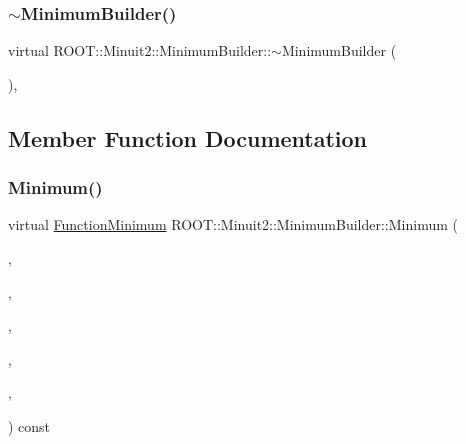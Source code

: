 \subsubsection{\texorpdfstring{$\sim$MinimumBuilder()}{~MinimumBuilder()}\hspace{0.1cm}{\footnotesize\ttfamily [3/3]}}
{\footnotesize\ttfamily virtual R\+O\+O\+T\+::\+Minuit2\+::\+Minimum\+Builder\+::$\sim$\+Minimum\+Builder (\begin{DoxyParamCaption}{ }\end{DoxyParamCaption})\hspace{0.3cm}{\ttfamily [inline]}, {\ttfamily [virtual]}}



\subsection{Member Function Documentation}
\mbox{\label{classROOT_1_1Minuit2_1_1MinimumBuilder_aefaa624436afa8195af1f3393a35981f}} 
\subsubsection{\texorpdfstring{Minimum()}{Minimum()}\hspace{0.1cm}{\footnotesize\ttfamily [1/3]}}
{\footnotesize\ttfamily virtual \mbox{\hyperlink{classROOT_1_1Minuit2_1_1FunctionMinimum}{Function\+Minimum}} R\+O\+O\+T\+::\+Minuit2\+::\+Minimum\+Builder\+::\+Minimum (\begin{DoxyParamCaption}\item[{const \mbox{\hyperlink{classROOT_1_1Minuit2_1_1MnFcn}{Mn\+Fcn}} \&}]{,  }\item[{const \mbox{\hyperlink{classROOT_1_1Minuit2_1_1GradientCalculator}{Gradient\+Calculator}} \&}]{,  }\item[{const \mbox{\hyperlink{classROOT_1_1Minuit2_1_1MinimumSeed}{Minimum\+Seed}} \&}]{,  }\item[{const \mbox{\hyperlink{classROOT_1_1Minuit2_1_1MnStrategy}{Mn\+Strategy}} \&}]{,  }\item[{unsigned int}]{,  }\item[{double}]{ }\end{DoxyParamCaption}) const\hspace{0.3cm}{\ttfamily [pure virtual]}}



